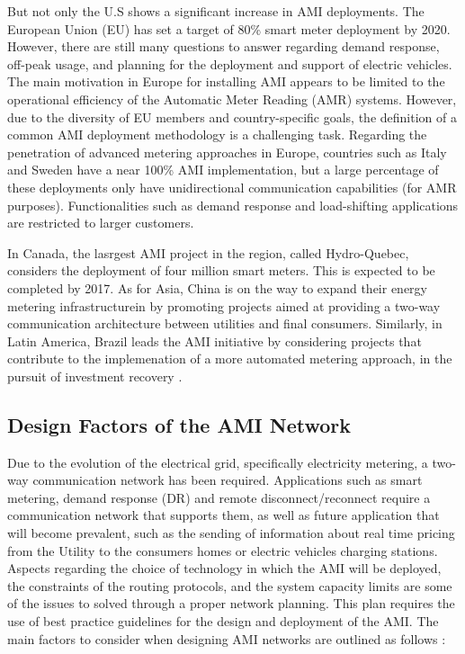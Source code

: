 \documentclass[11pt,draftclsnofoot,onecolumn]{IEEEtran}
\begin{document}
But not only the U.S shows a significant increase in AMI deployments. The European Union (EU) has set a target of 80\% smart meter deployment by 2020. However, there are still many questions to answer regarding demand response, off-peak usage, and planning for the deployment and support of electric vehicles. The main motivation in Europe for installing AMI appears to be limited to the operational efficiency of the Automatic Meter Reading (AMR) systems. However, due to the diversity of EU members and country-specific goals, the definition of a common AMI deployment methodology is a challenging task. Regarding the penetration of advanced metering approaches in Europe, countries such as Italy and Sweden have a near 100\% AMI implementation, but a large percentage of these deployments only have unidirectional communication capabilities (for AMR purposes). Functionalities such as demand response and load-shifting applications are restricted to larger customers. 

In Canada, the lasrgest AMI project in the region, called Hydro-Quebec, considers the deployment of four million smart meters. This is expected to be completed by 2017. As for Asia, China is on the way to expand their energy metering infrastructurein by promoting projects aimed at providing a two-way communication architecture between utilities and final consumers. Similarly, in Latin America, Brazil leads the AMI initiative by considering projects that contribute to the implemenation of a more automated metering approach, in the pursuit of investment recovery  \cite{Namboodiri2012}.


\subsection{Design Factors of the AMI Network}\label{designFactors}

Due to the evolution of the electrical grid, specifically electricity metering, a two-way communication network has been required. Applications such as smart metering, demand response (DR) and remote disconnect/reconnect require a communication network that supports them, as well as future application that will become prevalent, such as the sending of information about real time pricing from the Utility to the consumers homes or electric vehicles charging stations.  
Aspects regarding the choice of technology in which the AMI will be deployed, the constraints of the routing protocols, and the system capacity limits are some of the issues to solved through a proper network planning. This plan requires the use of best practice guidelines for the design and deployment of the AMI. The main factors to consider when designing AMI networks are outlined as follows \cite{Leon2011} :
\end{document}
